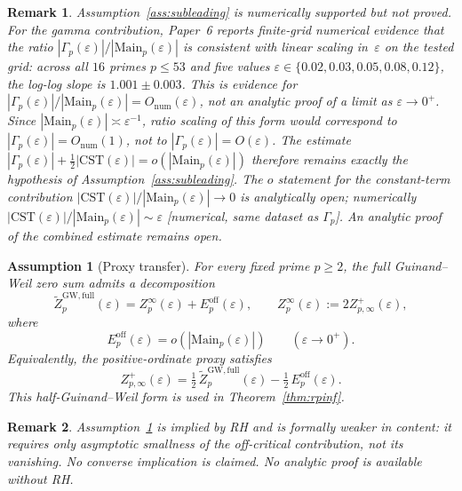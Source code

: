 \documentclass[11pt]{article}
\newtheorem{assumption}[theorem]{Assumption}
\newtheorem*{remark}{Remark}
\begin{document}
\begin{remark}
Assumption~\ref{ass:subleading} is numerically supported but not
proved. For the gamma contribution, Paper~6 reports finite-grid
numerical evidence that the ratio
$|\Gamma_p(\varepsilon)|/|\mathrm{Main}_p(\varepsilon)|$
is consistent with linear scaling in~$\varepsilon$ on the tested
grid: across all $16$ primes $p\le 53$ and five values
$\varepsilon\in\{0.02,0.03,0.05,0.08,0.12\}$, the log-log slope
is $1.001\pm 0.003$.
This is evidence for
$|\Gamma_p(\varepsilon)|/|\mathrm{Main}_p(\varepsilon)|
=O_{\mathrm{num}}(\varepsilon)$,
not an analytic proof of a limit as $\varepsilon\to 0^+$.
Since $|\mathrm{Main}_p(\varepsilon)|\asymp\varepsilon^{-1}$,
ratio scaling of this form would correspond to
$|\Gamma_p(\varepsilon)|=O_{\mathrm{num}}(1)$,
not to $|\Gamma_p(\varepsilon)|=O(\varepsilon)$.
The estimate
$|\Gamma_p(\varepsilon)|+\tfrac12|\mathrm{CST}(\varepsilon)|
=o(|\mathrm{Main}_p(\varepsilon)|)$
therefore remains exactly the hypothesis of
Assumption~\ref{ass:subleading}.
The $o$ statement for the constant-term contribution
$|\mathrm{CST}(\varepsilon)|/|\mathrm{Main}_p(\varepsilon)|\to 0$
is analytically open; numerically
$|\mathrm{CST}(\varepsilon)|/|\mathrm{Main}_p(\varepsilon)|\sim\varepsilon$
[numerical, same dataset as $\Gamma_p$].
An analytic proof of the combined estimate remains open.
\end{remark}

\begin{assumption}[Proxy transfer]
\label{ass:proxy}
For every fixed prime $p\ge 2$, the full Guinand--Weil zero
sum admits a decomposition
\[
\widetilde Z_p^{\mathrm{GW,full}}(\varepsilon)
  = Z_p^\infty(\varepsilon) + E_p^{\mathrm{off}}(\varepsilon),
\qquad
Z_p^\infty(\varepsilon)
  := 2 Z_{p,\infty}^+(\varepsilon),
\]
where
\[
E_p^{\mathrm{off}}(\varepsilon)
  = o(|\mathrm{Main}_p(\varepsilon)|)
  \qquad (\varepsilon\to 0^+).
\]
Equivalently, the positive-ordinate proxy satisfies
\[
Z_{p,\infty}^+(\varepsilon)
  = \tfrac12\,\widetilde Z_p^{\mathrm{GW,full}}(\varepsilon)
    - \tfrac12\,E_p^{\mathrm{off}}(\varepsilon).
\]
This half-Guinand--Weil form is used in
Theorem~\ref{thm:rpinf}.
\end{assumption}

\begin{remark}
Assumption~\ref{ass:proxy} is implied by RH and is formally
weaker in content: it requires only asymptotic smallness of the
off-critical contribution, not its vanishing.
No converse implication is claimed.
No analytic proof is available without RH.
\end{remark}
\end{document}
